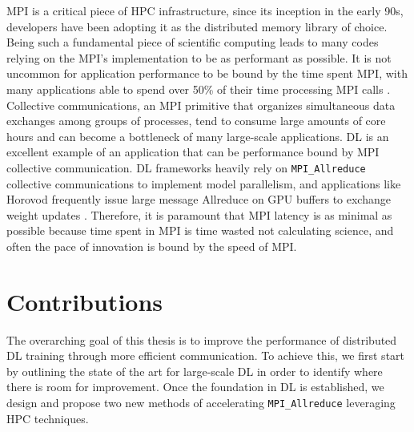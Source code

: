 \gls{MPI} is a critical piece of \gls{HPC} infrastructure, since its inception in the early 90s, developers have been adopting it as the distributed memory library of choice.
Being such a fundamental piece of scientific computing leads to many codes relying on the \gls{MPI}'s implementation to be as performant as possible.  
It is not uncommon for application performance to be bound by the time spent \gls{MPI}, with many applications able to spend over 50\% of their time processing \gls{MPI} calls \cite{Chunduri2018CharacterizeMPIonProd}.
Collective communications, an \gls{MPI} primitive that organizes simultaneous data exchanges among groups of processes, tend to consume large amounts of core hours and can become a bottleneck of many large-scale applications.
\gls{DL} is an excellent example of an application that can be performance bound by \gls{MPI} collective communication.
\gls{DL} frameworks heavily rely on \texttt{MPI\_Allreduce} collective communications to implement model parallelism, and applications like Horovod frequently issue large message Allreduce on \gls{GPU} buffers to exchange weight updates \cite{Awan2019CommProfDLonClusters, Jain2019PerfCharDNNTFPT, Alizadeh2022PAPCollDL}.
Therefore, it is paramount that \gls{MPI} latency is as minimal as possible because time spent in \gls{MPI} is time wasted not calculating science, and often the pace of innovation is bound by the speed of \gls{MPI}.

\section{Contributions}
The overarching goal of this thesis is to improve the performance of distributed \gls{DL} training through more efficient communication.
To achieve this, we first start by outlining the state of the art for large-scale \gls{DL} in order to identify where there is room for improvement.
Once the foundation in \gls{DL} is established, we design and propose two new methods of accelerating \texttt{MPI\_Allreduce} leveraging \gls{HPC} techniques.

